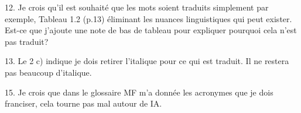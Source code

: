 12. Je crois qu'il est souhaité que les mots soient traduits simplement par exemple, Tableau 1.2 (p.13) éliminant les nuances linguistiques qui peut exister. Est-ce que j'ajoute une note de bas de tableau pour expliquer pourquoi cela n'est pas traduit?

13. Le 2 c) indique je dois retirer l'italique pour ce qui est traduit. Il ne restera pas beaucoup d'italique.


15. Je crois que dans le glossaire MF m'a donnée les acronymes que je dois franciser, cela tourne pas mal autour de IA.




